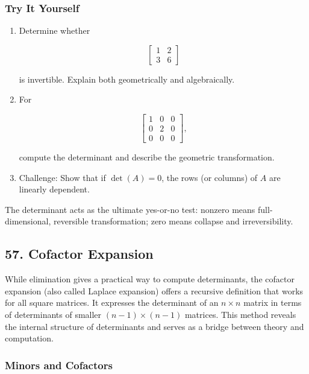 \documentclass[
  letterpaper,
  DIV=11,
  numbers=noendperiod]{scrreprt}
\begin{document}
\subsubsection{Try It Yourself}\label{try-it-yourself-55}

\begin{enumerate}
\def\labelenumi{\arabic{enumi}.}
\item
  Determine whether

  \[
  \begin{bmatrix} 1 & 2 \\ 3 & 6 \end{bmatrix}
  \]

  is invertible. Explain both geometrically and algebraically.
\item
  For

  \[
  \begin{bmatrix} 1 & 0 & 0 \\ 0 & 2 & 0 \\ 0 & 0 & 0 \end{bmatrix},
  \]

  compute the determinant and describe the geometric transformation.
\item
  Challenge: Show that if \(\det(A)=0\), the rows (or columns) of \(A\)
  are linearly dependent.
\end{enumerate}

The determinant acts as the ultimate yes-or-no test: nonzero means
full-dimensional, reversible transformation; zero means collapse and
irreversibility.

\subsection{57. Cofactor Expansion}\label{cofactor-expansion}

While elimination gives a practical way to compute determinants, the
cofactor expansion (also called Laplace expansion) offers a recursive
definition that works for all square matrices. It expresses the
determinant of an \(n \times n\) matrix in terms of determinants of
smaller \((n-1) \times (n-1)\) matrices. This method reveals the
internal structure of determinants and serves as a bridge between theory
and computation.

\subsubsection{Minors and Cofactors}\label{minors-and-cofactors}
\end{document}

